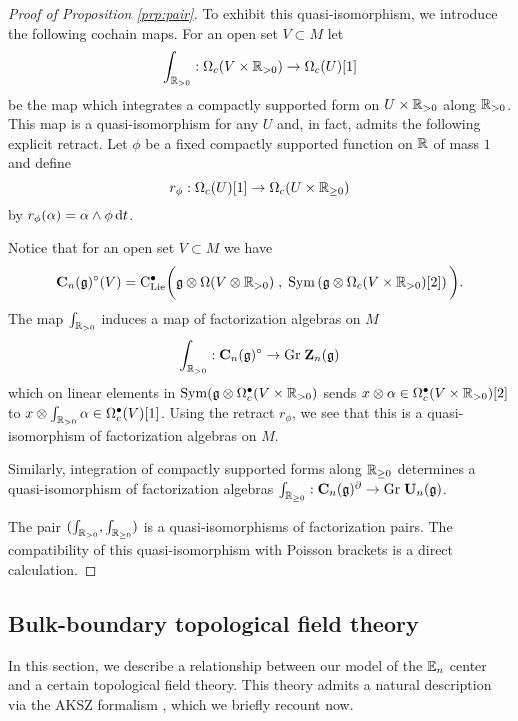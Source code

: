 \documentclass[11pt]{amsart}
\numberwithin{equation}{section}
\begin{document}
\begin{proof}[Proof of Proposition \ref{prp:pair}]
To exhibit this quasi-isomorphism, we introduce the following cochain maps.
For an open set $V \subset M$ let
\[
\int_{\mathbb R_{>0}} : \Omega_c(V \times \mathbb R_{>0}) \to \Omega_c (U) [1] 
\] 
be the map which integrates a compactly supported form on $U \times \mathbb R_{> 0}$ along $\mathbb R_{> 0}$. 
This map is a quasi-isomorphism for any $U$ and, in fact, admits the following explicit retract. 
Let $\phi$ be a fixed compactly supported function on $\mathbb R$ of mass $1$ and define
\[
r_\phi : \Omega_c(U) [1] \to \Omega_c (U \times \mathbb R_{\geq 0})
\]
by $r_\phi (\alpha) = \alpha \wedge \phi \, {\rm d} t$. 

Notice that for an open set $V \subset M$ we have 
\[
\mathbf C_n(\mathfrak g)^{\circ} (V) = {\rm C}_{\rm Lie}^\bullet \bigg(\mathfrak g \otimes \Omega (V \otimes \mathbb R_{>0} ) \; , \; {\rm Sym} \left(\mathfrak g \otimes \Omega_c(V \times \mathbb R_{>0}) [2] \right) \bigg)  .
\]
The map $\int_{\mathbb R_{>0}}$ induces a map of factorization algebras on $M$
\[
\int_{\mathbb R_{>0}} : \mathbf C_n(\mathfrak g)^\circ \to {\rm Gr} \; \mathbf Z_n (\mathfrak g)
\]
which on linear elements in ${\rm Sym}(\mathfrak g \otimes \Omega^\bullet_c (V \times \mathbb R_{>0})$ sends $x \otimes \alpha \in \Omega^\bullet_c(V \times \mathbb R_{>0})[2]$ to $x \otimes \int_{\mathbb R_{>0}} \alpha \in \Omega^\bullet_c (V)[1]$. 
Using the retract $r_\phi$, we see that this is a quasi-isomorphism of factorization algebras on $M$. 

Similarly, integration of compactly supported forms along $\mathbb R_{\geq 0}$ determines a quasi-isomorphism of factorization algebras $\int_{\mathbb R_{\geq 0}} : \mathbf C_n(\mathfrak g)^\partial \to {\rm Gr} \; \mathbf U_n(\mathfrak g)$.

The pair $(\int_{\mathbb R_{>0}} , \int_{\mathbb R_{\geq 0}})$ is a quasi-isomorphisms of factorization pairs. 
The compatibility of this quasi-isomorphism with Poisson brackets is a direct calculation. 
\end{proof}

\subsection{Bulk-boundary topological field theory}

In this section, we describe a relationship between our model of the $\mathbb E_n$ center and a certain topological field theory. 
This theory admits a natural description via the AKSZ formalism \cite{AKSZ}, which we briefly recount now. 
\end{document}
